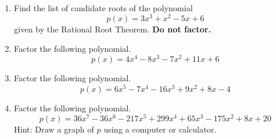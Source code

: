 \documentclass{article}
\begin{document}
\ActivityTitle[class={College Algebra}, number={4}, name={Polynomials 2}]

\begin{enumerate}
\item Find the list of candidate roots of the polynomial \[ p(x) = 3x^3 + x^2 - 5x + 6 \] given by the Rational Root Theorem. \textbf{Do not factor.}

   \vspace{3cm}

\item Factor the following polynomial. \[ p(x) = 4x^4 - 8x^3 - 7x^2 + 11x + 6 \]

   \vspace{7cm}

\newpage

\item Factor the following polynomial. \[ p(x) = 6x^5 - 7x^4 - 16x^3 + 9x^2 + 8x - 4 \]

   \vspace{7cm}

\newpage

\item Factor the following polynomial. \[ p(x) = 36x^7 - 36x^6 - 217x^5 + 299x^4 + 65x^3 - 175x^2 + 8x + 20 \] Hint: Draw a graph of $p$ using a computer or calculator.

   \vspace{7cm}
\end{enumerate}
\end{document}
